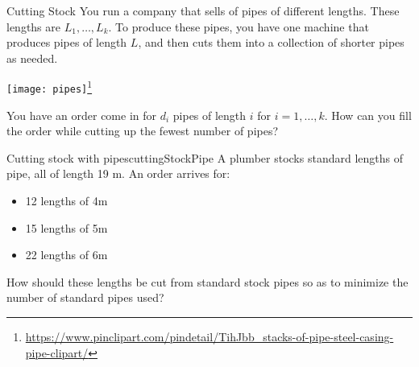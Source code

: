 \begin{general}{Cutting Stock}{}
You run a company that sells of pipes of different lengths.  These lengths are $L_1, \dots, L_k$.  To produce these pipes, you have one machine that produces pipes of length $L$, and then cuts them into a collection of shorter pipes as needed.  

\begin{center}
\texttt{[image: pipes]}\footnote{
\url{https://www.pinclipart.com/pindetail/TihJbb_stacks-of-pipe-steel-casing-pipe-clipart/}}
\end{center}

You have an order come in for $d_i$ pipes of length $i$ for $i=1, \dots, k$.  How can you fill the order while cutting up the fewest number of pipes?
\end{general}
\begin{example}{Cutting stock with pipes}{cuttingStockPipe}
A plumber stocks standard lengths of pipe, all of length 19 m. An order arrives for:
\begin{itemize}
\item  12 lengths of 4m
\item 15 lengths of 5m
\item 22 lengths of 6m
\end{itemize}
How should these lengths be cut from standard stock pipes so as to minimize
the number of standard pipes used?
\end{example}
\begin{center}
\end{center}

